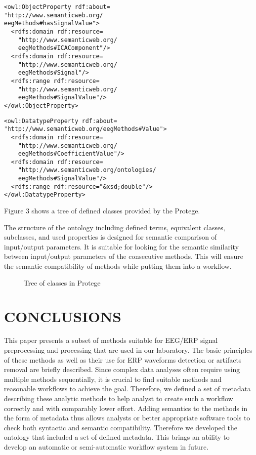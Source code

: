 \documentclass[a4paper,twoside]{article}
\begin{document}
\begin{small}
\begin{verbatim}
<owl:ObjectProperty rdf:about=
"http://www.semanticweb.org/
eegMethods#hasSignalValue">
  <rdfs:domain rdf:resource=
    "http://www.semanticweb.org/
    eegMethods#ICAComponent"/>
  <rdfs:domain rdf:resource=
    "http://www.semanticweb.org/
    eegMethods#Signal"/>
  <rdfs:range rdf:resource=
    "http://www.semanticweb.org/
    eegMethods#SignalValue"/>
</owl:ObjectProperty>
\end{verbatim}
\end{small}

\begin{small}
\begin{verbatim}
<owl:DatatypeProperty rdf:about=
"http://www.semanticweb.org/eegMethods#Value">
  <rdfs:domain rdf:resource=
    "http://www.semanticweb.org/
    eegMethods#CoefficientValue"/>
  <rdfs:domain rdf:resource=
    "http://www.semanticweb.org/ontologies/
    eegMethods#SignalValue"/>
  <rdfs:range rdf:resource="&xsd;double"/>
</owl:DatatypeProperty>
\end{verbatim}
\end{small}

\noindent Figure 3 shows a tree of defined classes provided by the Protege.

The structure of the ontology including defined terms, equivalent classes, subclasses, and used properties is designed for semantic comparison of input/output parameters. It is suitable for looking for the semantic similarity between input/output parameters of the consecutive methods. This will ensure the semantic compatibility of methods while putting them into a workflow.

\begin{figure}[!h]

  \centering
   {}
  \caption{Tree of classes in Protege}
  \label{fig:classTree}
 \end{figure}

\section{\uppercase{Conclusions}}
\label{sec:conclusion}

\noindent This paper presents a subset of methods suitable for EEG/ERP signal preprocessing and processing that are used in our laboratory. The basic principles of these methods as well as their use for ERP waveforms detection or artifacts removal are briefly described. Since complex data analyses often require using multiple methods sequentially, it is crucial to find suitable methods and reasonable workflows to achieve the goal. Therefore, we defined a set of metadata describing these analytic methods to help analyst to create such a workflow correctly and with comparably lower effort. Adding semantics to the methods in the form of metadata thus allows analysts or better appropriate software tools to check both syntactic and semantic compatibility. Therefore we developed the ontology that included a set of defined metadata. This brings an ability to develop an automatic or semi-automatic workflow system in future.
\end{document}

